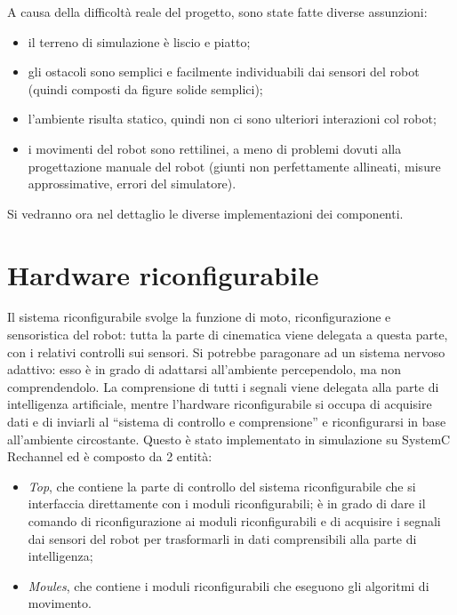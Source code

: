 \documentclass[a4paper,titlepage]{book}
\begin{document}
A causa della difficoltà reale del progetto, sono state fatte diverse assunzioni:
\begin{itemize}
  \item il terreno di simulazione è liscio e piatto;
  \item gli ostacoli sono semplici e facilmente individuabili dai sensori del robot (quindi composti da figure solide semplici);
  \item l'ambiente risulta statico, quindi non ci sono ulteriori interazioni col robot;
  \item i movimenti del robot sono rettilinei, a meno di problemi dovuti alla progettazione manuale del robot (giunti non perfettamente allineati, misure approssimative, errori del simulatore).
\end{itemize}

Si vedranno ora nel dettaglio le diverse implementazioni dei componenti.

\section{Hardware riconfigurabile}

Il sistema riconfigurabile svolge la funzione di moto, riconfigurazione e sensoristica del robot: tutta la parte di cinematica viene delegata a questa parte, con i relativi controlli sui sensori. Si potrebbe paragonare ad un sistema nervoso adattivo: esso è in grado di adattarsi all'ambiente percependolo, ma non comprendendolo. La comprensione di tutti i segnali viene delegata alla parte di intelligenza artificiale, mentre l'hardware riconfigurabile si occupa di acquisire dati e di inviarli al ``sistema di controllo e comprensione'' e riconfigurarsi in base all'ambiente circostante.
Questo è stato implementato in simulazione su SystemC Rechannel ed è composto da 2 entità:

\begin{itemize}
  \item \textit{Top}, che contiene la parte di controllo del sistema riconfigurabile che si interfaccia direttamente con i moduli riconfigurabili; è in grado di dare il comando di riconfigurazione ai moduli riconfigurabili e di acquisire i segnali dai sensori del robot per trasformarli in dati comprensibili alla parte di intelligenza;
  \item \textit{Moules}, che contiene i moduli riconfigurabili che eseguono gli algoritmi di movimento.
\end{itemize}
\end{document}
